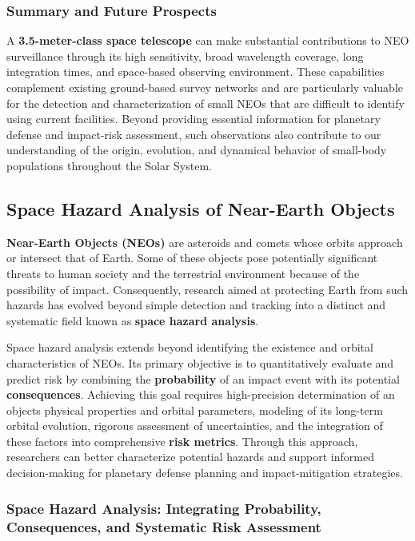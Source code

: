 \subsubsection{Summary and Future Prospects}

A \textbf{3.5-meter-class space telescope} can make substantial contributions to NEO surveillance through its high sensitivity, broad wavelength coverage, long integration times, and space-based observing environment. These capabilities complement existing ground-based survey networks and are particularly valuable for the detection and characterization of small NEOs that are difficult to identify using current facilities. Beyond providing essential information for planetary defense and impact-risk assessment, such observations also contribute to our understanding of the origin, evolution, and dynamical behavior of small-body populations throughout the Solar System.

\subsection{Space Hazard Analysis of Near-Earth Objects}

\textbf{Near-Earth Objects (NEOs)} are asteroids and comets whose orbits approach or intersect that of Earth. Some of these objects pose potentially significant threats to human society and the terrestrial environment because of the possibility of impact. Consequently, research aimed at protecting Earth from such hazards has evolved beyond simple detection and tracking into a distinct and systematic field known as \textbf{space hazard analysis}.

Space hazard analysis extends beyond identifying the existence and orbital characteristics of NEOs. Its primary objective is to quantitatively evaluate and predict risk by combining the \textbf{probability} of an impact event with its potential \textbf{consequences}. Achieving this goal requires high-precision determination of an object\textquotesingle s physical properties and orbital parameters, modeling of its long-term orbital evolution, rigorous assessment of uncertainties, and the integration of these factors into comprehensive \textbf{risk metrics}. Through this approach, researchers can better characterize potential hazards and support informed decision-making for planetary defense planning and impact-mitigation strategies.

\subsubsection{Space Hazard Analysis: Integrating Probability, Consequences, and Systematic Risk Assessment}

